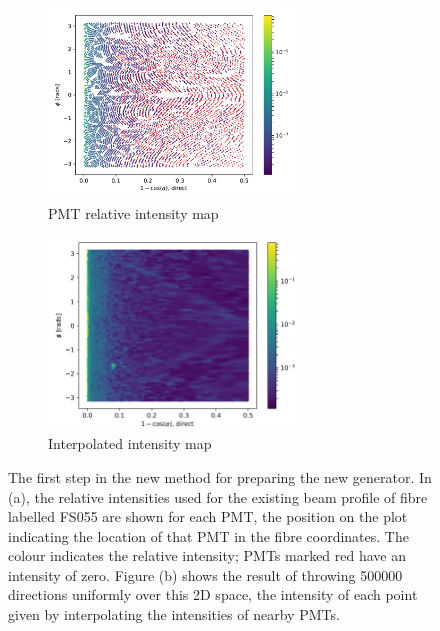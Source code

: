 \begin{figure}
    \centering
    \begin{subfigure}{0.98\textwidth}
        \centering
        \includegraphics[width=0.74\textwidth]{4_SMELLIESimulation/images/flat_plot_r_FS055_beam_profile_original_6-18-13.pdf}
        \caption{PMT relative intensity map}
        \label{fig:esther_beam_profile}
    \end{subfigure}
    \begin{subfigure}{0.98\textwidth}
        \centering
        \includegraphics[width=0.74\textwidth]{4_SMELLIESimulation/images/polar_plot_FS055_MC_sampling_old_beam_profile.png}
        \caption{Interpolated intensity map}
        \label{fig:old_profile_interpolated_sample_plot}
    \end{subfigure}
    \caption[Intensity map of existing beam profile, and interpolated sampling map]{The first step in the new method for preparing the new generator. In (a), the relative intensities used for the existing beam profile of fibre labelled FS055 are shown for each PMT, the position on the plot indicating the location of that PMT in the fibre coordinates. The colour indicates the relative intensity; PMTs marked red have an intensity of zero. Figure (b) shows the result of throwing \num{500000} directions uniformly over this 2D space, the intensity of each point given by interpolating the intensities of nearby PMTs.}
    \label{fig:esther_beam_profile_and_interp}
\end{figure}

